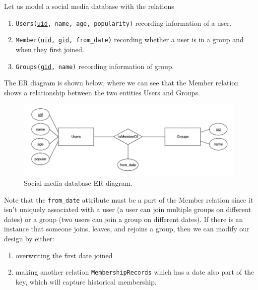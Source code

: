 \documentclass{article}
\begin{document}
      \begin{example}[E/R Diagram]
        Let us model a social media database with the relations 
        \begin{enumerate}
          \item \texttt{Users(\underline{uid}, name, age, popularity)} recording information of a user. 
          \item \texttt{Member(\underline{uid}, \underline{gid}, from\_date)} recording whether a user is in a group and when they first joined. 
          \item \texttt{Groups(\underline{gid}, name)} recording information of group. 
        \end{enumerate}
        The ER diagram is shown below, where we can see that the Member relation shows a relationship between the two entities Users and Groups. 

        \begin{figure}[H]
          \centering 
          \includegraphics[scale=0.4]{img/social_media.png}
          \caption{Social media database ER diagram.} 
          \label{fig:social_media}
        \end{figure}

        Note that the \texttt{from\_date} attribute must be a part of the Member relation since it isn't uniquely associated with a user (a user can join multiple groups on different dates) or a group (two users can join a group on different dates). If there is an instance that someone joins, leaves, and rejoins a group, then we can modify our design by either: 
        \begin{enumerate}
          \item overwriting the first date joined 
          \item making another relation \texttt{MembershipRecords} which has a date also part of the key, which will capture historical membership.  
        \end{enumerate}
      \end{example}
\end{document}
